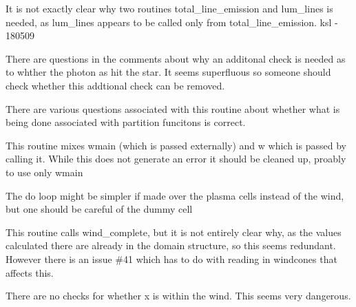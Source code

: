 \begin{DoxyRefList}
\item[\label{bug__bug000036}%
\Hypertarget{bug__bug000036}%
Global \hyperlink{templates_8h_a0abc40a64ed911b152833da9a675d1b4}{total\+\_\+line\+\_\+emission} (Wind\+Ptr one, double f1, double f2)]It is not exactly clear why two routines total\+\_\+line\+\_\+emission and lum\+\_\+lines is needed, as lum\+\_\+lines appears to be called only from total\+\_\+line\+\_\+emission. ksl -\/ 180509 
\item[\label{bug__bug000041}%
\Hypertarget{bug__bug000041}%
Global \hyperlink{templates_8h_aa1ffd17034054d51819328d892fc57e8}{translate\+\_\+in\+\_\+space} (Phot\+Ptr pp)]There are questions in the comments about why an additonal check is needed as to whther the photon as hit the star. It seems superfluous so someone should check whether this addtional check can be removed. 
\item[\label{bug__bug000062}%
\Hypertarget{bug__bug000062}%
Global \hyperlink{variable__temperature_8c_a72d9769510683e30aeef87c2a255ebe4}{variable\+\_\+temperature} (Plasma\+Ptr xplasma, int mode)]There are various questions associated with this routine about whether what is being done associated with partition funcitons is correct. 
\item[\label{bug__bug000063}%
\Hypertarget{bug__bug000063}%
Global \hyperlink{wind2d_8c_a8fe8eb8bacb888783ada9dd32b523e1a}{wind\+\_\+div\+\_\+err} ]This routine mixes wmain (which is passed externally) and w which is passed by calling it. While this does not generate an error it should be cleaned up, proably to use only wmain 
\item[\label{bug__bug000021}%
\Hypertarget{bug__bug000021}%
Global \hyperlink{templates_8h_ae1d27b840ad2ff21462921fc2aab975c}{wind\+\_\+luminosity} (double f1, double f2)]The do loop might be simpler if made over the plasma cells instead of the wind, but one should be careful of the dummy cell 
\item[\label{bug__bug000065}%
\Hypertarget{bug__bug000065}%
Global \hyperlink{windsave_8c_a1bf368d85f72b220cc4cba091a5e0702}{wind\+\_\+read} (filename)]This routine calls wind\+\_\+complete, but it is not entirely clear why, as the values calculated there are already in the domain structure, so this seems redundant. However there is an issue \#41 which has to do with reading in windcones that affects this.  
\item[\label{bug__bug000061}%
\Hypertarget{bug__bug000061}%
Global \hyperlink{util_8c_ad2938cb78e3414274491d2d778843db3}{wind\+\_\+x\+\_\+to\+\_\+n} (double x\mbox{[}\mbox{]}, int $\ast$n)]There are no checks for whether x is within the wind. This seems very dangerous. 

\end{DoxyRefList}
